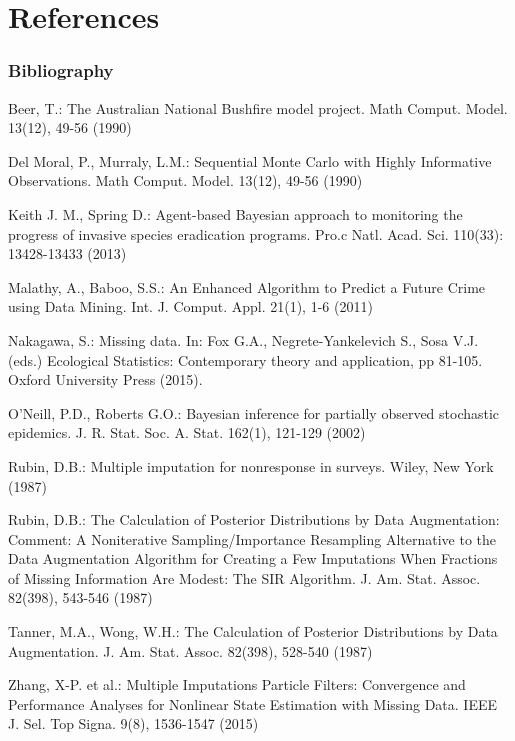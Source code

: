 \documentclass[9pt]{beamer}
\begin{document}
\section{References}

\begin{frame}[shrink=15]
\frametitle{Bibliography}
\begin{thebibliography}{}

{\small {} 
Beer, T.: The Australian National Bushfire model project. Math Comput. Model. 13(12), 49-56 (1990)

Del Moral, P., Murraly, L.M.: Sequential Monte Carlo with Highly Informative Observations. Math Comput. Model. 13(12), 49-56 (1990)

Keith J. M., Spring D.: Agent-based Bayesian approach to monitoring the progress of invasive species eradication programs. Pro.c Natl. Acad. Sci. 110(33): 13428-13433 (2013)

Malathy, A., Baboo, S.S.: An Enhanced Algorithm to Predict a Future Crime using Data Mining. Int. J. Comput. Appl. 21(1), 1-6 (2011)

Nakagawa, S.: Missing data. In: Fox G.A., Negrete-Yankelevich S., Sosa V.J. (eds.) Ecological Statistics: Contemporary theory and application, pp 81-105. Oxford University Press (2015). 

O'Neill, P.D., Roberts G.O.: Bayesian inference for partially observed stochastic epidemics. J. R. Stat. Soc. A. Stat. 162(1), 121-129 (2002)

Rubin, D.B.: Multiple imputation for nonresponse in surveys. Wiley, New York (1987)

Rubin, D.B.: The Calculation of Posterior Distributions by Data Augmentation: Comment: A Noniterative Sampling/Importance Resampling Alternative to the Data Augmentation Algorithm for Creating a Few Imputations When Fractions of Missing Information Are Modest: The SIR Algorithm. J. Am. Stat. Assoc. 82(398), 543-546 (1987)

Tanner, M.A., Wong, W.H.: The Calculation of Posterior Distributions by Data Augmentation. J. Am. Stat. Assoc. 82(398), 528-540 (1987)

Zhang, X-P. et al.: Multiple Imputations Particle Filters: Convergence and Performance Analyses for Nonlinear State Estimation with Missing Data. IEEE J. Sel. Top Signa. 9(8), 1536-1547 (2015)}

\end{thebibliography}
\end{frame}
\end{document}
